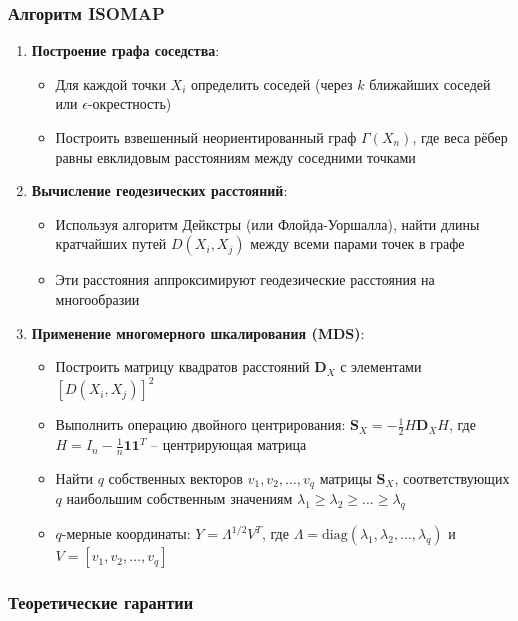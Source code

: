 \documentclass[a4paper,12pt]{article}
\begin{document}
\subsubsection{Алгоритм ISOMAP}

\begin{enumerate}
    \item \textbf{Построение графа соседства}:
    \begin{itemize}
        \item Для каждой точки $X_i$ определить соседей (через $k$ ближайших соседей или $\epsilon$-окрестность)
        \item Построить взвешенный неориентированный граф $\Gamma(X_n)$, где веса рёбер равны евклидовым расстояниям между соседними точками
    \end{itemize}
    
    \item \textbf{Вычисление геодезических расстояний}:
    \begin{itemize}
        \item Используя алгоритм Дейкстры (или Флойда-Уоршалла), найти длины кратчайших путей $D(X_i, X_j)$ между всеми парами точек в графе
        \item Эти расстояния аппроксимируют геодезические расстояния на многообразии
    \end{itemize}
    
    \item \textbf{Применение многомерного шкалирования (MDS)}:
    \begin{itemize}
        \item Построить матрицу квадратов расстояний $\mathbf{D}_X$ с элементами $[D(X_i, X_j)]^2$
        \item Выполнить операцию двойного центрирования: $\mathbf{S}_X = -\frac{1}{2}H\mathbf{D}_XH$, где $H = I_n - \frac{1}{n}\mathbf{1}\mathbf{1}^T$ -- центрирующая матрица
        \item Найти $q$ собственных векторов $v_1, v_2, \ldots, v_q$ матрицы $\mathbf{S}_X$, соответствующих $q$ наибольшим собственным значениям $\lambda_1 \geq \lambda_2 \geq \ldots \geq \lambda_q$
        \item $q$-мерные координаты: $Y = \Lambda^{1/2}V^T$, где $\Lambda = \text{diag}(\lambda_1, \lambda_2, \ldots, \lambda_q)$ и $V = [v_1, v_2, \ldots, v_q]$
    \end{itemize}
\end{enumerate}

\subsubsection{Теоретические гарантии}
\end{document}
